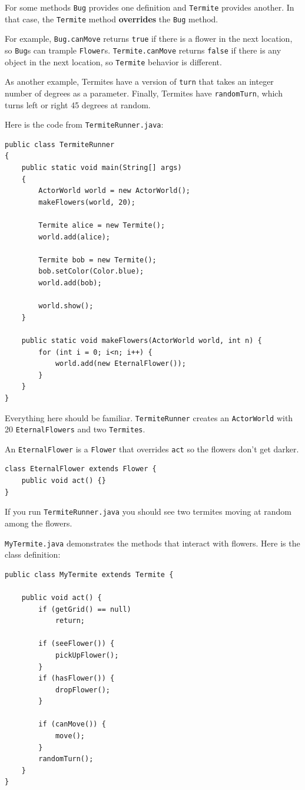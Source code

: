 \documentclass[12pt]{book}
\theoremstyle{exercise}
\begin{document}
For some methods {\tt Bug} provides one definition and {\tt Termite}
provides another.  In that case, the {\tt Termite} method
{\bf overrides} the {\tt Bug} method.

For example, {\tt Bug.canMove}
returns {\tt true} if there is a flower in the next location, so
{\tt Bug}s can trample {\tt Flower}s.  {\tt Termite.canMove} returns
{\tt false} if there is any object in the next location, so
{\tt Termite} behavior is different.

As another example, Termites have a version of {\tt turn} that takes
an integer number of degrees as a parameter.  Finally, Termites
have {\tt randomTurn}, which turns left or right 45 degrees at random.


Here is the code from {\tt TermiteRunner.java}:

\begin{lstlisting}
public class TermiteRunner
{
    public static void main(String[] args)
    {
        ActorWorld world = new ActorWorld();
        makeFlowers(world, 20);

        Termite alice = new Termite();
        world.add(alice);

        Termite bob = new Termite();
        bob.setColor(Color.blue);
        world.add(bob);

        world.show();
    }

    public static void makeFlowers(ActorWorld world, int n) {
        for (int i = 0; i<n; i++) {
            world.add(new EternalFlower());
        }
    }
}
\end{lstlisting}

Everything here should be familiar.  {\tt TermiteRunner} creates
an {\tt ActorWorld} with 20 {\tt EternalFlowers} and two {\tt Termites}.

An {\tt EternalFlower} is a {\tt Flower} that overrides {\tt act}
so the flowers don't get darker.

\begin{lstlisting}
class EternalFlower extends Flower {
    public void act() {}
}
\end{lstlisting}

If you run {\tt TermiteRunner.java} you should see two termites
moving at random among the flowers.

{\tt MyTermite.java} demonstrates the methods that interact with
flowers.  Here is the class definition:

\begin{lstlisting}
public class MyTermite extends Termite {

    public void act() {
        if (getGrid() == null)
            return;

        if (seeFlower()) {
            pickUpFlower();
        }
        if (hasFlower()) {
            dropFlower();
        }

        if (canMove()) {
            move();
        }
        randomTurn();
    }
}
\end{lstlisting}
\end{document}
